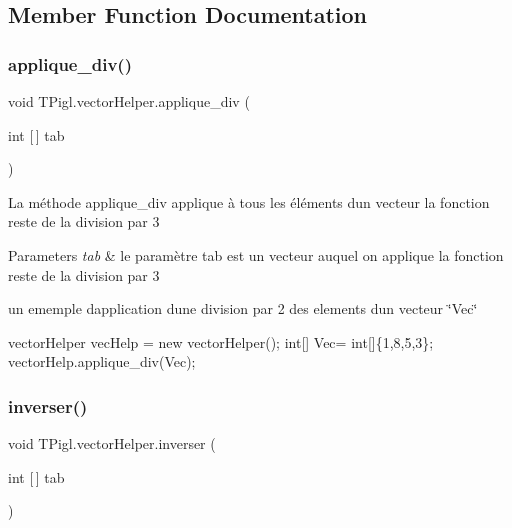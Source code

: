 \subsection{Member Function Documentation}
\mbox{\label{class_t_pigl_1_1vector_helper_af3e69c4ec5721ea9236aad4ddb2995cb}} 
\subsubsection{\texorpdfstring{applique\+\_\+div()}{applique\_div()}}
{\footnotesize\ttfamily void T\+Pigl.\+vector\+Helper.\+applique\+\_\+div (\begin{DoxyParamCaption}\item[{int \mbox{[}$\,$\mbox{]}}]{tab }\end{DoxyParamCaption})}



La méthode applique\+\_\+div applique à tous les éléments d\textquotesingle{}un vecteur la fonction reste de la division par 3 


\begin{DoxyParams}{Parameters}
{\em tab} & le paramètre tab est un vecteur auquel on applique la fonction reste de la division par 3\\
\hline
\end{DoxyParams}


un ememple d\textquotesingle{}application d\textquotesingle{}une division par 2 des elements d\textquotesingle{}un vecteur \char`\"{}\+Vec\char`\"{} 
\begin{DoxyCode}
vectorHelper vecHelp = \textcolor{keyword}{new} vectorHelper();
  \textcolor{keywordtype}{int}[] Vec= \textcolor{keywordtype}{int}[]\{1,8,5,3\}; 
  vectorHelp.applique\_div(Vec);
\end{DoxyCode}
 \mbox{\label{class_t_pigl_1_1vector_helper_a90f5b534a7762117ce843ce79be2fced}} 
\subsubsection{\texorpdfstring{inverser()}{inverser()}}
{\footnotesize\ttfamily void T\+Pigl.\+vector\+Helper.\+inverser (\begin{DoxyParamCaption}\item[{int \mbox{[}$\,$\mbox{]}}]{tab }\end{DoxyParamCaption})}



